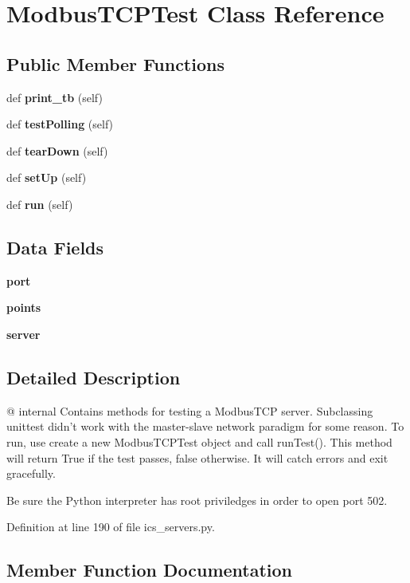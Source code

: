 \section{Modbus\+T\+C\+P\+Test Class Reference}
\label{classprotolibs_1_1ics__servers_1_1_modbus_t_c_p_test}
\subsection*{Public Member Functions}
\begin{DoxyCompactItemize}
\item 
def {\bf print\+\_\+tb} (self)
\item 
def {\bf test\+Polling} (self)
\item 
def {\bf tear\+Down} (self)
\item 
def {\bf set\+Up} (self)
\item 
def {\bf run} (self)
\end{DoxyCompactItemize}
\subsection*{Data Fields}
\begin{DoxyCompactItemize}
\item 
{\bf port}
\item 
{\bf points}
\item 
{\bf server}
\end{DoxyCompactItemize}


\subsection{Detailed Description}
\begin{DoxyVerb}@ internal
   Contains methods for testing a ModbusTCP server. Subclassing unittest 
        didn't work  with the master-slave network paradigm for some reason.
    To run, use create a new ModbusTCPTest object and call runTest(). This
    method will return True if the test passes, false otherwise. It will
    catch errors and exit gracefully. 
    
    Be sure the Python interpreter has root priviledges in order to open
    port 502.
\end{DoxyVerb}
 

Definition at line 190 of file ics\+\_\+servers.\+py.



\subsection{Member Function Documentation}
